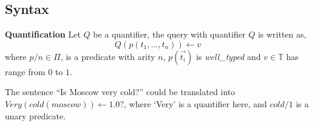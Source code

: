 \subsection{Syntax}
\label{sec:QuantificationSyntax}
\begin{defin} \textbf{Quantification}
\label{def:Quantification}
Let $Q$ be a quantifier, the query with quantifier $Q$ is written as,
\[Q(p(t_1,...,t_n)) \leftarrow v\]
where $p/n \in \Pi$, is a predicate with arity $n$, $p(\vec{t_i})$ is \textit{well\_typed} and $v \in \mathbb{T}$ has range from $0$ to $1$.
\end{defin}

\begin{ex}
\label{ex:Quantification}
The sentence ``Is Moscow very cold?'' could be translated into $Very(cold(moscow)) \leftarrow 1.0 ?$, where `Very' is a quantifier here, and $cold/1$ is a unary predicate.
\end{ex}



